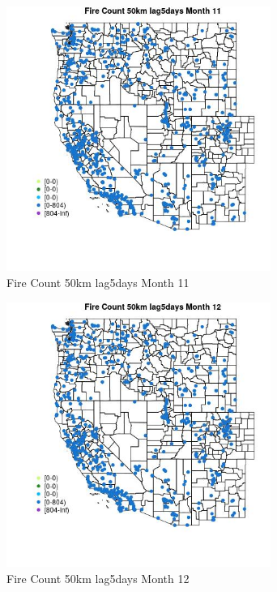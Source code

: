 \begin{figure} 
\centering  
\includegraphics[width=0.77\textwidth]{Code_Outputs/Report_ML_input_PM25_Step4_part_f_de_duplicated_aves_prioritize_24hr_obswNAs_MapObsMo11Fire_Count_50km_lag5days.jpg} 
\caption{\label{fig:Report_ML_input_PM25_Step4_part_f_de_duplicated_aves_prioritize_24hr_obswNAsMapObsMo11Fire_Count_50km_lag5days}Fire Count 50km lag5days Month 11} 
\end{figure} 
 

\begin{figure} 
\centering  
\includegraphics[width=0.77\textwidth]{Code_Outputs/Report_ML_input_PM25_Step4_part_f_de_duplicated_aves_prioritize_24hr_obswNAs_MapObsMo12Fire_Count_50km_lag5days.jpg} 
\caption{\label{fig:Report_ML_input_PM25_Step4_part_f_de_duplicated_aves_prioritize_24hr_obswNAsMapObsMo12Fire_Count_50km_lag5days}Fire Count 50km lag5days Month 12} 
\end{figure} 
 

